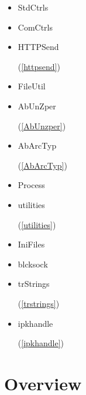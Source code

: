\documentclass{report}
\begin{document}
\begin{itemize}
\item \begin{ttfamily}StdCtrls\end{ttfamily}\item \begin{ttfamily}ComCtrls\end{ttfamily}\item \begin{ttfamily}HTTPSend\end{ttfamily}(\ref{httpsend})\item \begin{ttfamily}FileUtil\end{ttfamily}\item \begin{ttfamily}AbUnZper\end{ttfamily}(\ref{AbUnzper})\item \begin{ttfamily}AbArcTyp\end{ttfamily}(\ref{AbArcTyp})\item \begin{ttfamily}Process\end{ttfamily}\item \begin{ttfamily}utilities\end{ttfamily}(\ref{utilities})\item \begin{ttfamily}IniFiles\end{ttfamily}\item \begin{ttfamily}blcksock\end{ttfamily}\item \begin{ttfamily}trStrings\end{ttfamily}(\ref{trstrings})\item \begin{ttfamily}ipkhandle\end{ttfamily}(\ref{ipkhandle})\end{itemize}
\section{Overview}
\begin{description}
\item[\texttt{\begin{ttfamily}TUExecFm\end{ttfamily} Class}]
\end{description}
\end{document}
